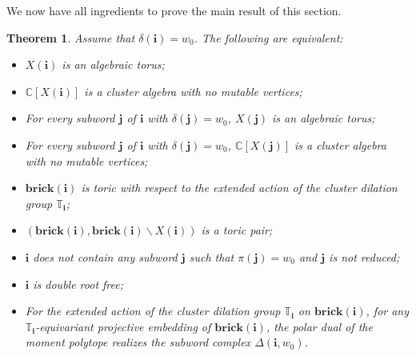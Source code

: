 \documentclass[a4paper, 11pt]{amsart}
\newcommand{\brick}{\mathbf{brick}}
\newcommand{\word}[1]{\mathbf{#1}}
\newcommand{\dil}[1]{\mathbb{T}_{#1}}
\newtheorem{theorem}{Theorem}[section]
\theoremstyle{definition}
\begin{document}


We now have all ingredients to prove the main result of this section.

\begin{theorem}\label{thm:braid-is-torus}
Assume that $\delta(\word{i}) = w_0$. The following are equivalent: 
\begin{itemize}
\item[(a)] $X(\word{i})$ is an algebraic torus;
\item[(b)] $\mathbb{C}[X(\word{i})]$ is a cluster algebra with no mutable vertices;
\item[(c)] For every subword $\word{j}$ of $\word{i}$ with $\delta(\word{j})= w_0$,  $X(\word{j})$ is an algebraic torus;
\item[(d)] For every subword $\word{j}$ of $\word{i}$ with $\delta(\word{j})= w_0$,  $\mathbb{C}[X(\word{j})]$ is a cluster algebra with no mutable vertices;
\item[(e)] $\brick(\word{i})$ is toric with respect to the extended action of the cluster dilation group $\dil{\word{i}}$;
\item[(f)] $(\brick(\word{i}), \brick(\word{i}) \backslash X(\word{i}))$ is a toric pair;
\item[(g)] $\word{i}$ does not contain any subword $\word{j}$ such that $\pi(\word{j}) = w_0$ and $\word{j}$ is not reduced;
\item[(h)] $\word{i}$ is double root free;
\item[(i)] For the extended action of the cluster dilation group $\dil{\word{i}}$ on $\brick(\word{i})$, for any $\dil{\word{i}}$-equivariant projective embedding of $\brick(\word{i})$, the polar dual of the moment polytope realizes the subword complex $\Delta(\word{i}, w_0)$.
\end{itemize}
\end{theorem}
\end{document}
